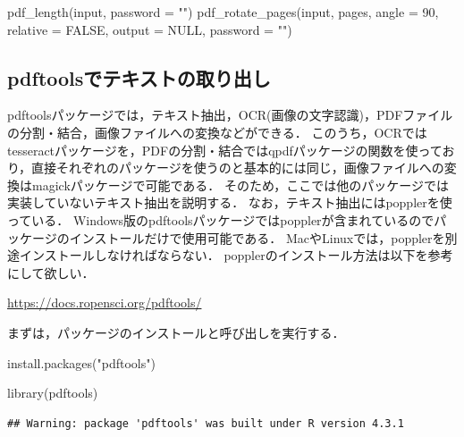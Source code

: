 \documentclass[
]{article}
\newenvironment{Shaded}{\begin{snugshade}}{\end{snugshade}}
\newcommand{\AttributeTok}[1]{\textcolor[rgb]{0.77,0.63,0.00}{#1}}
\newcommand{\ConstantTok}[1]{\textcolor[rgb]{0.00,0.00,0.00}{#1}}
\newcommand{\DecValTok}[1]{\textcolor[rgb]{0.00,0.00,0.81}{#1}}
\newcommand{\FunctionTok}[1]{\textcolor[rgb]{0.00,0.00,0.00}{#1}}
\newcommand{\NormalTok}[1]{#1}
\newcommand{\StringTok}[1]{\textcolor[rgb]{0.31,0.60,0.02}{#1}}
\begin{document}
\begin{Shaded}
\begin{Highlighting}[]
\FunctionTok{pdf\_length}\NormalTok{(input, }\AttributeTok{password =} \StringTok{""}\NormalTok{)   }
\FunctionTok{pdf\_rotate\_pages}\NormalTok{(input, pages, }\AttributeTok{angle =} \DecValTok{90}\NormalTok{, }\AttributeTok{relative =} \ConstantTok{FALSE}\NormalTok{, }\AttributeTok{output =} \ConstantTok{NULL}\NormalTok{, }\AttributeTok{password =} \StringTok{""}\NormalTok{)   }
\end{Highlighting}
\end{Shaded}

\hypertarget{pdftools}{%
\subsection{pdftoolsでテキストの取り出し}\label{pdftools}}

pdftoolsパッケージでは，テキスト抽出，OCR(画像の文字認識)，PDFファイルの分割・結合，画像ファイルへの変換などができる．
このうち，OCRではtesseractパッケージを，PDFの分割・結合ではqpdfパッケージの関数を使っており，直接それぞれのパッケージを使うのと基本的には同じ，画像ファイルへの変換はmagickパッケージで可能である．
そのため，ここでは他のパッケージでは実装していないテキスト抽出を説明する．
なお，テキスト抽出にはpopplerを使っている．
Windows版のpdftoolsパッケージではpopplerが含まれているのでパッケージのインストールだけで使用可能である．
MacやLinuxでは，popplerを別途インストールしなければならない．
popplerのインストール方法は以下を参考にして欲しい．

\url{https://docs.ropensci.org/pdftools/}

まずは，パッケージのインストールと呼び出しを実行する．

\begin{Shaded}
\begin{Highlighting}[]
\FunctionTok{install.packages}\NormalTok{(}\StringTok{"pdftools"}\NormalTok{)}
\end{Highlighting}
\end{Shaded}

\begin{Shaded}
\begin{Highlighting}[]
\FunctionTok{library}\NormalTok{(pdftools)}
\end{Highlighting}
\end{Shaded}

\begin{verbatim}
## Warning: package 'pdftools' was built under R version 4.3.1
\end{verbatim}
\end{document}
